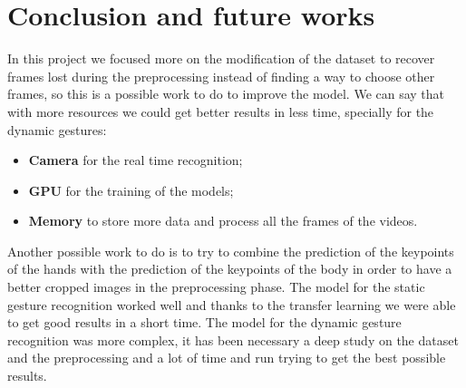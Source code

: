 \documentclass[10pt,twocolumn,letterpaper]{article}
\begin{document}
\section{Conclusion and future works}
In this project we focused more on the modification of the dataset to recover frames lost 
during the preprocessing instead of finding a way to choose other frames, so this is 
a possible work to do to improve the model.
We can say that with more resources we could get better results in less time, 
specially for the dynamic gestures:
\begin{itemize}
   \item \textbf{Camera} for the real time recognition;
   \item \textbf{GPU} for the training of the models;
   \item \textbf{Memory} to store more data and process all the frames of the videos.
\end{itemize}
Another possible work to do is to try to combine the prediction of the keypoints of the hands
with the prediction of the keypoints of the body in order to have a better cropped images in the 
preprocessing phase. 
The model for the static gesture recognition worked well and thanks to the transfer learning 
we were able to get good results in a short time. The model for the dynamic gesture recognition
was more complex, it has been necessary a deep study on the dataset and the preprocessing and a lot of time 
and run trying to get the best possible results.

{\small


}
\end{document}
